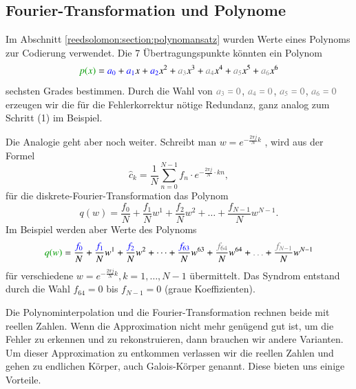 \subsection{Fourier-Transformation und Polynome\label{reedsolomon:subsection:ftandpolynom}}
Im Abschnitt \ref{reedsolomon:section:polynomansatz}
wurden Werte eines Polynoms zur Codierung verwendet.
Die 7 Übertragungspunkte könnten ein Polynom
\begin{equation}
	\textcolor{darkgreen}{p(x)}
	=
	\textcolor{blue}{a_0} + \textcolor{blue}{a_1}x + \textcolor{blue}{a_2}x^2 +
	\textcolor{gray}{a_3}x^3 + \textcolor{gray}{a_4}x^4 + \textcolor{gray}{a_5}x^5 +
	\textcolor{gray}{a_6}x^6
\label{reedsolomon:equationpoly}
\end{equation}
sechsten Grades bestimmen.
Durch die Wahl von $\textcolor{gray}{a_3=0}$, $\textcolor{gray}{a_4=0}$, $\textcolor{gray}{a_5=0}$, $\textcolor{gray}{a_6=0}$ 
erzeugen wir die für die Fehlerkorrektur nötige Redundanz, ganz analog zum Schritt (1) im Beispiel.
\par 
Die Analogie geht aber noch weiter.
 Schreibt man 
 \( w =
 e^{-\frac{2\pi j}{N} k}\)
 \label{reedsolomon:DFT_summand}, wird aus der Formel
 \begin{equation}
	\hat{c}_{k} 
	= \frac{1}{N} \sum_{n=0}^{N-1}
	{f}_n \cdot e^{-\frac{2\pi j}{N} \cdot kn}
	,\label{reedsolomon:DFT}
 \end{equation}
 für die diskrete-Fourier-Transformation das Polynom
 \begin{equation}
	q(w)=
	\frac{{f}_0}{N} + \frac{{f}_1}{N} w^1 + \frac{{f}_2}{N} w^2 + \dots + \frac{{f}_{N-1}}{N} w^{N-1}.
	\label{reedsolomon:DFT_polynom}
 \end{equation}
 Im Beispiel werden aber Werte des Polynoms
 \begin{equation}
	\textcolor{darkgreen}{q(w)}=
	\frac{\textcolor{blue}{{f}_0}}{N} + \frac{\textcolor{blue}{{f}_1}}{N} w^1 + \frac{\textcolor{blue}{{f}_2}}{N} w^2 + \dots + 
	\frac{\textcolor{blue}{{f}_{63}}}{N} w^{63} + \frac{\textcolor{gray}{{f}_{64}}}{N} w^{64} + \textcolor{gray}{\dots} + \frac{\textcolor{gray}{{f}_{N-1}}}{N} w^{N-1}
	\label{reedsolomon:DFT_polynom2}
 \end{equation}
	für verschiedene \( w = e^{-\frac{2\pi j}{N} k}, k=1, \dots ,N-1\) übermittelt.
Das Syndrom entstand durch die Wahl ${f_{64}}=0$ bis ${f}_{N-1}=0$ (graue Koeffizienten).

Die Polynominterpolation und die Fourier-Transformation rechnen beide mit reellen Zahlen.
Wenn die Approximation nicht mehr genügend gut ist, um die Fehler zu erkennen und zu rekonstruieren,
dann brauchen wir andere Varianten.
Um dieser Approximation zu entkommen verlassen wir die reellen Zahlen und gehen zu endlichen Körper, auch Galois-Körper genannt.
%
%
%
Diese bieten uns einige Vorteile.
